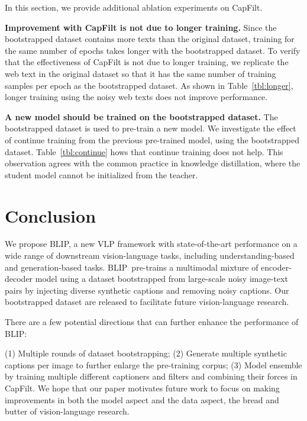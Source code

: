 In this section, we provide additional ablation experiments on CapFilt.

\textbf{Improvement with CapFilt is not due to longer training.} Since the bootstrapped dataset contains more texts than the original dataset, training for the same number of epochs takes longer with the bootstrapped dataset. To verify that the effectiveness of CapFilt is not due to longer training, we replicate the web text in the original dataset so that it has the same number of training samples per epoch as the bootstrapped dataset. As shown in Table~\ref{tbl:longer}, 
longer training using the noisy web texts does not improve performance.

\textbf{A new model should be trained on the bootstrapped dataset.} The bootstrapped dataset is used to pre-train a new model. We investigate the effect of continue training from the previous pre-trained model, using the bootstrapped dataset. 
Table~\ref{tbl:continue} hows that continue training does not help. This observation agrees with the common practice in knowledge distillation, where the student model cannot be initialized from the teacher.

\section{Conclusion}

We propose BLIP, a new VLP framework with state-of-the-art performance on a wide range of downstream vision-language tasks, including understanding-based and generation-based tasks. BLIP~pre-trains a multimodal mixture of encoder-decoder model using a dataset bootstrapped from large-scale noisy image-text pairs by injecting diverse synthetic captions and removing noisy captions. Our bootstrapped dataset are released to facilitate future vision-language research.

There are a few potential directions that can further enhance the performance of BLIP:

(1) Multiple rounds of dataset bootstrapping; (2) Generate multiple synthetic captions per image to further enlarge the pre-training corpus; (3) Model ensemble by training multiple different captioners and filters and combining their forces in CapFilt. We hope that our paper motivates future work to focus on making improvements in both the model aspect and the data aspect, the bread and butter of vision-language research.


